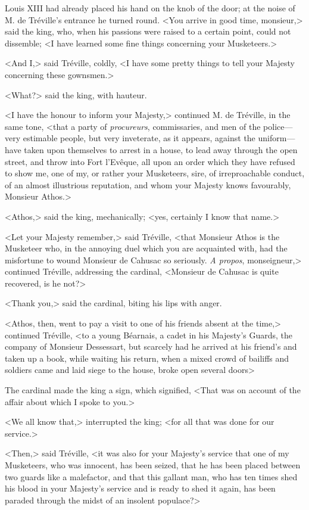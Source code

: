 Louis XIII had already placed his hand on the knob of the door; at the noise of M. de Tréville's entrance he turned round. <You arrive in good time, monsieur,> said the king, who, when his passions were raised to a certain point, could not dissemble; <I have learned some fine things concerning your Musketeers.> 

<And I,> said Tréville, coldly, <I have some pretty things to tell your Majesty concerning these gownsmen.> 

<What?> said the king, with hauteur. 

<I have the honour to inform your Majesty,> continued M. de Tréville, in the same tone, <that a party of \textit{procureurs}, commissaries, and men of the police---very estimable people, but very inveterate, as it appears, against the uniform---have taken upon themselves to arrest in a house, to lead away through the open street, and throw into Fort l'Evêque, all upon an order which they have refused to show me, one of my, or rather your Musketeers, sire, of irreproachable conduct, of an almost illustrious reputation, and whom your Majesty knows favourably, Monsieur Athos.> 

<Athos,> said the king, mechanically; <yes, certainly I know that name.> 

<Let your Majesty remember,> said Tréville, <that Monsieur Athos is the Musketeer who, in the annoying duel which you are acquainted with, had the misfortune to wound Monsieur de Cahusac so seriously. \textit{A propos}, monseigneur,> continued Tréville, addressing the cardinal, <Monsieur de Cahusac is quite recovered, is he not?> 

<Thank you,> said the cardinal, biting his lips with anger. 

<Athos, then, went to pay a visit to one of his friends absent at the time,> continued Tréville, <to a young Béarnais, a cadet in his Majesty's Guards, the company of Monsieur Dessessart, but scarcely had he arrived at his friend's and taken up a book, while waiting his return, when a mixed crowd of bailiffs and soldiers came and laid siege to the house, broke open several doors\longdash> 

The cardinal made the king a sign, which signified, <That was on account of the affair about which I spoke to you.> 

<We all know that,> interrupted the king; <for all that was done for our service.> 

<Then,> said Tréville, <it was also for your Majesty's service that one of my Musketeers, who was innocent, has been seized, that he has been placed between two guards like a malefactor, and that this gallant man, who has ten times shed his blood in your Majesty's service and is ready to shed it again, has been paraded through the midst of an insolent populace?> 

